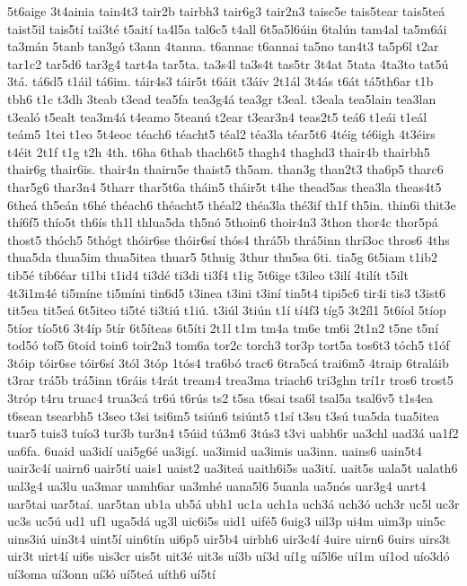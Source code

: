 {5t6aige
3t4ainia
tain4t3
tair2b
tairbh3
tair6g3
tair2n3
taisc5e
tais5tear
tais5teá
taist5il
tais5tí
tai3té
t5aití
ta4l5a
tal6c5
t4all
6t5a5l6úin
6talún
tam4al
ta5m6ái
ta3mán
5tanb
tan3gó
t3ann
4tanna.
t6annac
t6annai
ta5no
tan4t3
ta5p6l
t2ar
tar1c2
tar5d6
tar3g4
tart4a
tar5ta.
ta3s4l
ta3s4t
tas5tr
3t4at
5tata
4ta3to
tat5ú
3tá.
tá6d5
t1áil
tá6im.
táir4s3
táir5t
t6áit
t3áiv
2t1ál
3t4ás
t6át
tá5th6ar
t1b
tbh6
t1c
t3dh
3teab
t3ead
tea5fa
tea3g4á
tea3gr
t3eal.
t3eala
tea5lain
tea3lan
t3ealó
t5ealt
tea3m4á
t4eamo
5teanú
t2ear
t3ear3n4
teas2t5
teá6
t1eái
t1eál
teám5
1tei
t1eo
5t4eoc
téach6
téacht5
téal2
téa3la
téar5t6
4téig
té6igh
4t3éirs
t4éit
2t1f
t1g
t2h
4th.
t6ha
6thab
thach6t5
thagh4
thaghd3
thair4b
thairbh5
thair6g
thair6is.
thair4n
thairn5e
thaist5
th5am.
than3g
than2t3
tha6p5
tharc6
thar5g6
thar3n4
5tharr
thar5t6a
tháin5
tháir5t
t4he
thead5as
thea3la
theas4t5
6theá
th5eán
t6hé
théach6
théacht5
théal2
théa3la
thé3if
th1f
th5in.
thin6i
thit3e
thí6f5
thío5t
th6ís
th1l
thlua5da
th5nó
5thoin6
thoir4n3
3thon
thor4c
thor5pá
thost5
thóch5
5thógt
thóir6se
thóir6sí
thós4
thrá5b
thrá5inn
thrí3oc
thros6
4ths
thua5da
thua5im
thua5itea
thuar5
5thuig
3thur
thu5sa
6ti.
tia5g
6t5iam
t1ib2
tib5é
tib6éar
ti1bi
t1id4
ti3dé
ti3di
ti3f4
t1ig
5t6ige
t3ileo
t3ilí
4tilít
t5ilt
4t3i1m4é
ti5míne
ti5míni
tin6d5
t3inea
t3ini
t3iní
tin5t4
tipi5c6
tir4i
tis3
t3ist6
tit5ea
tit5eá
6t5iteo
ti5té
ti3tiú
t1iú.
t3iúl
3tiún
t1í
tí4f3
tíg5
3t2íl1
5t6íol
5tíop
5tíor
tío5t6
3t4íp
5tír
6t5íteas
6t5íti
2t1l
t1m
tm4a
tm6e
tm6i
2t1n2
t5ne
t5ní
tod5ó
tof5
6toid
toin6
toir2n3
tom6a
tor2c
torch3
tor3p
tort5a
tos6t3
tóch5
t1óf
3tóip
tóir6se
tóir6sí
3tól
3tóp
1tós4
tra6bó
trac6
6tra5cá
trai6m5
4traip
6traláib
t3rar
trá5b
trá5inn
t6ráis
t4rát
tream4
trea3ma
triach6
tri3ghn
trí1r
tros6
trost5
3tróp
t4ru
truac4
trua3cá
tr6ú
t6rús
ts2
t5sa
t6sai
tsa6l
tsal5a
tsal6v5
t1s4ea
t6sean
tsearbh5
t3seo
t3si
tsi6m5
tsiún6
tsiúnt5
t1sí
t3su
t3sú
tua5da
tua5itea
tuar5
tuis3
tuío3
tur3b
tur3n4
t5úid
tú3m6
3tús3
t3vi
uabh6r
ua3chl
uad3á
ua1f2
ua6fa.
6uaid
ua3idí
uai5g6é
ua3igí.
ua3imid
ua3imis
ua3inn.
uains6
uain5t4
uair3c4í
uairn6
uair5tí
uais1
uaist2
ua3iteá
uaith6i5s
ua3ití.
uait5s
uala5t
ualath6
ual3g4
ua3lu
ua3mar
uamh6ar
ua3mhé
uana5l6
5uanla
ua5nós
uar3g4
uart4
uar5tai
uar5taí.
uar5tan
ub1a
ub5á
ubh1
uc1a
uch1a
uch3á
uch3ó
uch3r
uc5l
uc3r
uc3s
uc5ú
ud1
uf1
uga5dá
ug3l
uic6i5s
uid1
uifé5
6uig3
uil3p
ui4m
uim3p
uin5c
uins3iú
uin3t4
uint5í
uin6tín
ui6p5
uir5b4
uirbh6
uir3c4í
4uire
uirn6
6uirs
uirs3t
uir3t
uirt4í
ui6s
uis3cr
uis5t
uit3é
uit3s
uí3b
uí3d
uí1g
uí5l6e
uí1m
uí1od
uío3dó
uí3oma
uí3onn
uí3ó
uí5teá
uíth6
uí5tí
}
